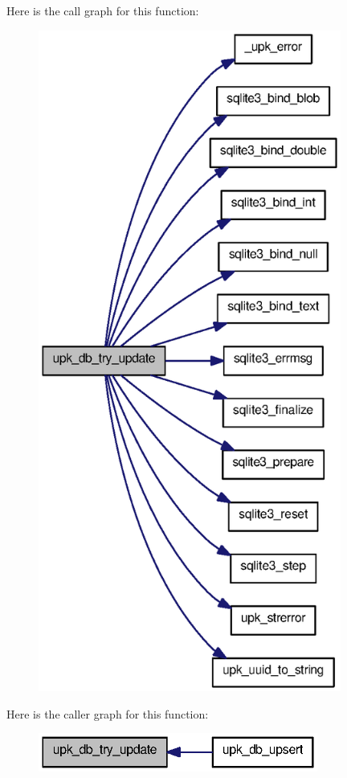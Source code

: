 Here is the call graph for this function:
\nopagebreak
\begin{figure}[H]
\begin{center}
\leavevmode
\includegraphics[width=282pt]{controller_2tp_8c_a53ec64d322d09e9d36a48d706db3b1c0_cgraph}
\end{center}
\end{figure}




Here is the caller graph for this function:
\nopagebreak
\begin{figure}[H]
\begin{center}
\leavevmode
\includegraphics[width=260pt]{controller_2tp_8c_a53ec64d322d09e9d36a48d706db3b1c0_icgraph}
\end{center}
\end{figure}


